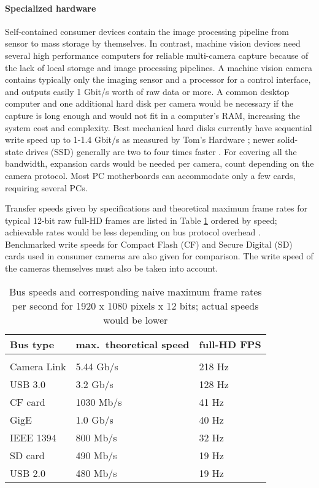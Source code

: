 \paragraph{Specialized hardware}
Self-contained consumer devices contain the image processing pipeline from sensor to mass storage by themselves.
In contrast, machine vision devices need several high performance computers for reliable multi-camera capture because of the lack of local storage and image processing pipelines.
A machine vision camera contains typically only the imaging sensor and a processor for a control interface, and outputs easily 1 Gbit/s worth of raw data or more.
A common desktop computer and one additional hard disk per camera would be necessary if the capture is long enough and would not fit in a computer's RAM, increasing the system cost and complexity.
Best mechanical hard disks currently have sequential write speed up to 1-1.4 Gbit/s as measured by Tom's Hardware \cite{tomshw-hddwrite};
newer solid-state drives (SSD) generally are two to four times faster \cite{tomshw-ssdwrite}.
For covering all the bandwidth, expansion cards would be needed per camera, count depending on the camera protocol.
Most PC motherboards can accommodate only a few cards, requiring several PCs.

Transfer speeds given by specifications and theoretical maximum frame rates for typical 12-bit raw full-HD frames are listed in Table \ref{tab:busspeeds} ordered by speed; achievable rates would be less depending on bus protocol overhead \cite{hornberg2007handbook,ni2013choosing}.
Benchmarked \cite{tomshw-sdwrite,tomshw-cfwrite} write speeds for Compact Flash (CF) and Secure Digital (SD) cards used in consumer cameras are also given for comparison.
The write speed of the cameras themselves must also be taken into account.

\begin{table}[t]
	\centering
	\begin{tabular}{l l l}
		Bus type & max.~theoretical speed & full-HD FPS\\
		\hline \\
		Camera Link \cite{ni2013choosing} & 5.44 Gb/s & 218 Hz\\
		USB 3.0 \cite{ni2013choosing} & 3.2 Gb/s & 128 Hz\\
		CF card \cite{tomshw-cfwrite} & 1030 Mb/s & 41 Hz\\
		GigE \cite{ni2013choosing} & 1.0 Gb/s & 40 Hz\\
		IEEE 1394 \cite{ni2013choosing} & 800 Mb/s & 32 Hz\\
		SD card \cite{tomshw-sdwrite} & 490 Mb/s & 19 Hz\\
		USB 2.0 \cite{ni2013choosing} & 480 Mb/s & 19 Hz\\
	\end{tabular}
	\caption{Bus speeds and corresponding naive maximum frame rates per second for 1920 x 1080 pixels x 12 bits; actual speeds would be lower}
	\label{tab:busspeeds}
\end{table}

